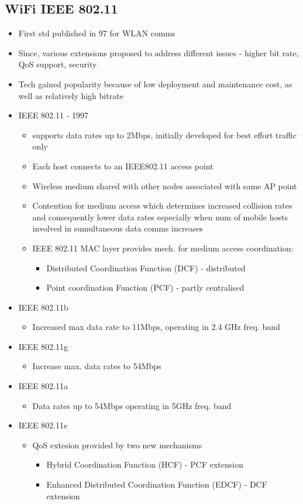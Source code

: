 \subsection{WiFi IEEE 802.11}
\begin{itemize}
	\item First std published in 97 for WLAN comms
	\item Since, various extensions proposed to address different issues -
		higher bit rate, QoS support, security
	\item Tech gained popularity because of low deployment and maintenance
		cost, as well as relatively high bitrate
	\item IEEE 802.11 - 1997
	\begin{itemize}
		\item supports data rates up to 2Mbps, initially developed for
			best effort traffic only
		\item Each host connects to an IEEE802.11 access point
		\item Wireless medium shared with other nodes associated with
			same AP point
		\item Contention for medium access which determines increased
			collision rates and consequently lower data rates
			especially when num of mobile hosts involved in
			sumultaneous data comms increases
		\item IEEE 802.11 MAC layer provides mech. for medium access
			coordination:
		\begin{itemize}
			\item Distributed Coordination Function (DCF) -
				distributed
			\item Point coordination Function (PCF) - partly
				centralised
		\end{itemize}
	\end{itemize}
	\item IEEE 802.11b
	\begin{itemize}
		\item Increased max data rate to 11Mbps, operating in 2.4 GHz
			freq. band
	\end{itemize}
	\item IEEE 802.11g
	\begin{itemize}
		\item Increase max. data rates to 54Mbps
	\end{itemize}
	\item IEEE 802.11a
	\begin{itemize}
		\item Data rates up to 54Mbps operating in 5GHz freq. band
	\end{itemize}
	\item IEEE 802.11e
	\begin{itemize}
		\item QoS extesion provided by two new mechanisms
		\begin{itemize}
			\item Hybrid Coordination Function (HCF) - PCF extension
			\item Enhanced Distributed Coordination Function (EDCF)
				- DCF extension
		\end{itemize}
	\end{itemize}
\end{itemize}
